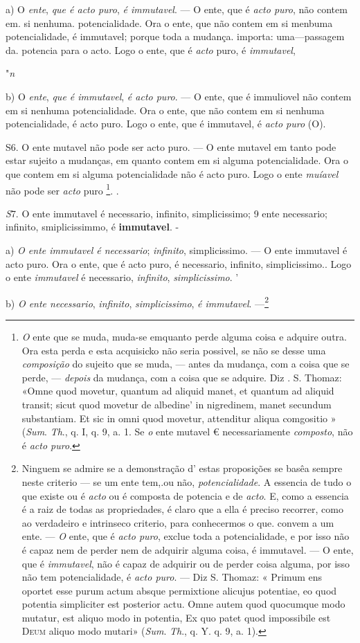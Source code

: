  a) O \emph{ente}, \emph{que é acto puro}, \emph{é immutavel}. --- O ente, que é \emph{acto puro}, não contem em. si nenhuma. potencialidade. Ora o ente, que não contem em si menbuma potencialidade, é immutavel; porque toda a mudança. importa: uma---passagem da. potencia para o acto. Logo o ente, que é \emph{acto} puro, é \emph{immutavel},

"\emph{n}

b) O \emph{ente}, \emph{que é immutavel}, \emph{é acto puro}. --- O ente, que é immuliovel não contem em si nenhuma potencialidade. Ora o ente, que não contem em si nenhuma potencialidade, é acto puro. Logo o ente, que é immutavel, é \emph{acto puro} (O).

S6. O ente mutavel não pode ser acto puro. --- O ente mutavel em tanto pode estar sujeito a mudanças, em quanto contem em si alguma potencialidade. Ora o que contem em si alguma potencialidade não é acto puro. Logo o ente \emph{muíavel} não pode ser \emph{acto} puro \footnote{\emph{O} ente que se muda, muda-se emquanto perde alguma coisa e adquire outra. Ora esta perda e esta acquisicko não seria possivel, se não se desse uma \emph{composição} do sujeito que se muda, --- antes da mudança, com a coisa que se perde, --- \emph{depois} da mudança, com a coisa que se adquire. Diz . S. Thomaz: «Omne quod movetur, quantum ad aliquid manet, et quantum ad aliquid transit; sicut quod movetur de albedine' in nigredinem, manet secundum substantiam. Et sic in omni quod movetur, attenditur aliqua comgositio » (\emph{Sum}. \emph{Th}., q. I, q. 9, a. 1. Se \emph{o} ente mutavel € necessariamente \emph{composto}, não é \emph{acto puro}.}. .

\emph{S}7. O ente immutavel é necessario, infinito, simplicissimo; \textbar{} 9 ente necessario; infinito, smiplicissimmo, é \textbf{immutavel}. -

a) \emph{O ente immutavel é necessario}; \emph{infinito}, simplicissimo. --- O ente immutavel é acto puro. Ora o ente, que é acto puro, é necessario, infinito, simplicissimo.. Logo o ente \emph{immutavel} é necessario, \emph{infinito}, \emph{simplicissimo}. '

b) \emph{O ente necessario}, \emph{infinito}, \emph{simplicissimo}, \emph{é immutavel}. ---\footnote{Ninguem se admire se a demonstração d' estas proposições se basêa sempre neste criterio --- se um ente tem,.ou não, \emph{potencialidade}. A essencia de tudo o que existe ou é \emph{acto} ou é composta de potencia e de \emph{acto}. E, como a essencia é a raiz de todas as propriedades, é claro que a ella é preciso recorrer, como ao verdadeiro e intrinseco criterio, para conhecermos o que. convem a um ente. --- \emph{O} ente, que é \emph{acto puro}, exclue toda a potencialidade, e por isso não é capaz nem de perder nem de adquirir alguma coisa, é immutavel. --- O ente, que é \emph{immutavel}, não é capaz de adquirir ou de perder coisa alguma, por isso não tem potencialidade, é \emph{acto puro}. --- Diz S. Thomaz: « Primum ens oportet esse purum actum absque permixtione alicujus potentiae, eo quod potentia simpliciter est posterior actu. Omne autem quod quocumque modo mutatur, est aliquo modo in potentia, Ex quo patet quod impossibile est \textsc{Deum} aliquo modo mutari» (\emph{Sum}. \emph{Th}., q. Y. q. 9, a. 1).} 